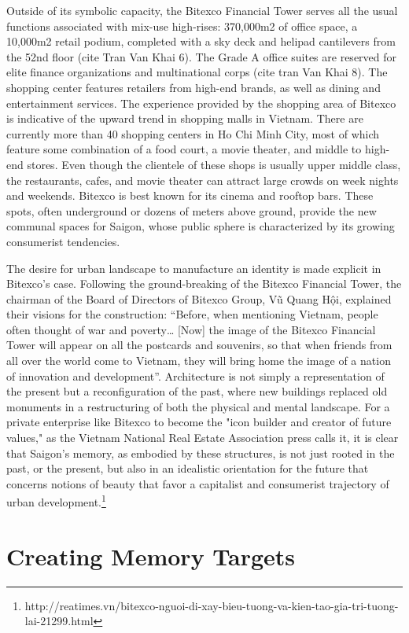 Outside of its symbolic capacity, the Bitexco Financial Tower serves all the usual functions associated with mix-use high-rises: 370,000m2 of office space, a 10,000m2 retail podium, completed with a sky deck and helipad cantilevers from the 52nd floor (cite Tran Van Khai 6). The Grade A office suites are reserved for elite finance organizations and multinational corps (cite tran Van Khai 8). The shopping center features retailers from high-end brands, as well as dining and entertainment services.  The experience provided by the shopping area of Bitexco is indicative of the upward trend in shopping malls in Vietnam. There are currently more than 40 shopping centers in Ho Chi Minh City, most of which feature some combination of a food court, a movie theater, and middle to high-end stores.  Even though the clientele of these shops is usually upper middle class, the restaurants, cafes, and movie theater can attract large crowds on week nights and weekends. Bitexco is best known for its cinema and rooftop bars. These spots, often underground or dozens of meters above ground, provide the new communal spaces for Saigon, whose public sphere is characterized by its growing consumerist tendencies.

The desire for urban landscape to manufacture an identity is made explicit in Bitexco’s case. Following the ground-breaking of the Bitexco Financial Tower, the chairman of the Board of Directors of Bitexco Group, Vũ Quang Hội, explained their visions for the construction: “Before, when mentioning Vietnam, people often thought of war and poverty… [Now] the image of the Bitexco Financial Tower will appear on all the postcards and souvenirs, so that when friends from all over the world come to Vietnam, they will bring home the image of a nation of innovation and development”. Architecture is not simply a representation of the present but a reconfiguration of the past, where new buildings replaced old monuments in a restructuring of both the physical and mental landscape. For a private enterprise like Bitexco to become the "icon builder and creator of future values," as the Vietnam National Real Estate Association press calls it, it is clear that Saigon's memory, as embodied by these structures, is not just rooted in the past, or the present, but also in an idealistic orientation for the future that concerns notions of beauty that favor a capitalist and consumerist trajectory of urban development.\footnote{http://reatimes.vn/bitexco-nguoi-di-xay-bieu-tuong-va-kien-tao-gia-tri-tuong-lai-21299.html}

\section{Creating Memory Targets}
\en
